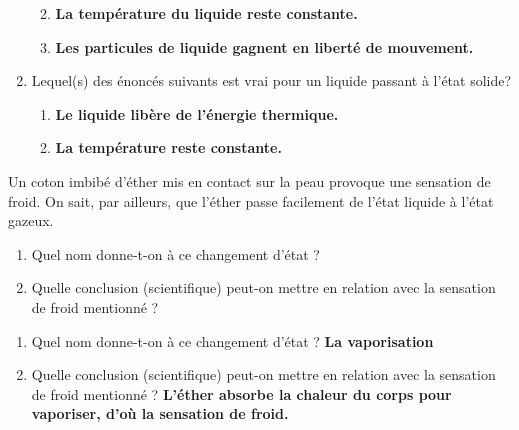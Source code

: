 \documentclass[
  11pt,
  french,
  a4paper,
  openany]{book}
\providecommand{\tightlist}{%
  \setlength{\itemsep}{0pt}\setlength{\parskip}{0pt}}
\begin{document}
\begin{Answer}
\begin{enumerate}
  \begin{enumerate}
  \def\labelenumii{\alph{enumii}.}
  \tightlist
  \item
    \textbf{La température du liquide reste constante.}
  \item
    \textbf{Les particules de liquide gagnent en liberté de mouvement.}
  \end{enumerate}
\item
  Lequel(s) des énoncés suivants est vrai pour un liquide passant à l'état solide?

  \begin{enumerate}
  \def\labelenumii{\alph{enumii}.}
  \tightlist
  \item
    \textbf{Le liquide libère de l'énergie thermique.}
  \item
    \textbf{La température reste constante.}
  \end{enumerate}
\end{enumerate}


\end{Answer}

\begin{Exercise}

Un coton imbibé d'éther mis en contact sur la peau provoque une sensation de froid. On sait, par ailleurs, que l'éther passe facilement de l'état liquide à l'état gazeux.

\begin{enumerate}
\def\labelenumi{\arabic{enumi}.}
\item
  Quel nom donne-t-on à ce changement d'état ?
  ~
\item
  Quelle conclusion (scientifique) peut-on mettre en relation avec la sensation de froid mentionné ?
  ~
\end{enumerate}


\end{Exercise}

\begin{Answer}

\begin{enumerate}
\def\labelenumi{\arabic{enumi}.}
\tightlist
\item
  Quel nom donne-t-on à ce changement d'état ?
  \textbf{La vaporisation}
\item
  Quelle conclusion (scientifique) peut-on mettre en relation avec la sensation de froid mentionné ?
  \textbf{L'éther absorbe la chaleur du corps pour vaporiser, d'où la sensation de froid.}
\end{enumerate}


\end{Answer}
\end{document}
